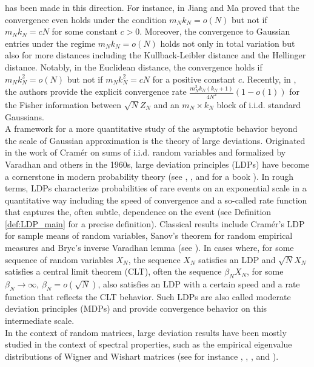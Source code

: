 \documentclass[11pt,a4paper,twoside]{article}
\theoremstyle{definition}
\begin{document}
has been made in this direction. For instance, in \cite{DistancesJiang} Jiang and Ma proved that the convergence even holds under the condition $m_N k_N = o(N)$ but not if $m_Nk_N = cN$ for some constant $c>0$. Moreover, the convergence to Gaussian entries under the regime $m_Nk_N=o(N)$ holds not only in total variation but also for more distances including the Kullback-Leibler distance and the Hellinger distance. Notably, in the Euclidean distance, the convergence holds if $m_Nk_N^2 = o(N)$ but not if $m_N k_N^2 = cN$ for a positive constant $c$. Recently, in \cite[Theorem 1]{chen2025fisher}, the authors provide the explicit convergence rate $\frac{m_N^2k_N(k_N+1)}{4N^2}(1-o(1))$ for the Fisher information between $\sqrt{N}Z_N$ and an $m_N\times k_N$ block of i.i.d. standard Gaussians.  \\
	A framework for a more quantitative study of the asymptotic behavior beyond the scale of Gaussian approximation is the theory of large deviations. Originated in the work of Cramér on sums of i.i.d. random variables and formalized by Varadhan and others in the 1960s, large deviation principles (LDPs) have become a cornerstone in modern probability theory (see \cite{cramer1938nouveau}, \cite{donsker1975asymptotic}, \cite{varadhan1966asymptotic} and for a book \cite{dembo2009techniques}). In rough terms, LDPs characterize probabilities of rare events on an exponential scale in a quantitative way including the speed of convergence and a so-called rate function that captures the, often subtle, dependence on the event (see Definition \ref{def:LDP_main} for a precise definition). Classical results include Cramér's LDP for sample means of random variables, Sanov's theorem for random empirical measures and Bryc's inverse Varadhan lemma (see \cite[Chapters 4 and 6]{dembo2009techniques}). In cases where, for some sequence of random variables $X_N$, the sequence $X_N$ satisfies an LDP and $\sqrt{N}X_N$ satisfies a central limit theorem (CLT), often the sequence $\beta_NX_N$, for some $\beta_N\to\infty$, $\beta_N = o(\sqrt{N})$, also satisfies an LDP with a certain speed and a rate function that reflects the CLT behavior. Such LDPs are also called moderate deviation principles (MDPs) and provide convergence behavior on this intermediate scale. \\
	In the context of random matrices, large deviation results have been mostly studied in the context of spectral properties, such as the empirical eigenvalue distributions of Wigner and Wishart matrices (see for instance \cite{anderson2010introduction}, \cite{guionnet2004large}, \cite{wigner1958distribution}, \cite{wigner1993characteristic} and \cite{wishart1928generalised}). \\
\end{document}
